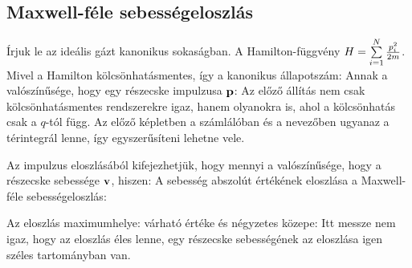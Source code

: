   \subsection{Maxwell-féle sebességeloszlás}
   
   Írjuk le az ideális gázt kanonikus sokaságban. A Hamilton-függvény $H=\sum\limits_{i=1}^{N}\frac{p_i^2}{2m}$. Mivel a Hamilton kölcsönhatásmentes, így a kanonikus állapotszám:
   Annak a valószínűsége, hogy egy részecske impulzusa $\mathbf{p}$:
   Az előző állítás nem csak kölcsönhatásmentes rendszerekre igaz, hanem olyanokra is, ahol a kölcsönhatás csak a $q$-tól függ. Az előző képletben a számlálóban és a nevezőben ugyanaz a térintegrál lenne, így egyszerűsíteni lehetne vele.
   
   Az impulzus eloszlásából kifejezhetjük, hogy mennyi a valószínűsége, hogy a részecske sebessége $\mathbf{v}$, hiszen:
   A sebesség abszolút értékének eloszlása a Maxwell-féle sebességeloszlás:
   
   Az eloszlás maximumhelye:
   várható értéke és négyzetes közepe:
   Itt messze nem igaz, hogy az eloszlás éles lenne, egy részecske sebességének az eloszlása igen széles tartományban van. 
   
